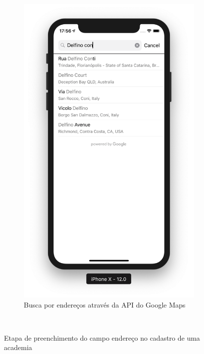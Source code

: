 \begin{figure}[H]
\begin{subfigure}[b]{0.4\textwidth}
        \includegraphics[width=\textwidth]{pfc/figuras/delfino-conti.png}
        \caption{Busca por endereços através da API do Google Maps}
        \label{fig:search-delfino}
    \end{subfigure}
    ~
    \caption{Etapa de preenchimento do campo endereço no cadastro de uma academia}
    \label{fig:addreess-field-fill}
\end{figure}

